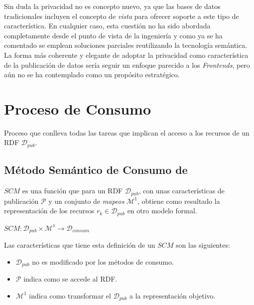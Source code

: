 Sin duda la privacidad no es concepto nuevo, ya que las bases de datos tradicionales incluyen el concepto
de \textit{vista} para ofrecer soporte a este tipo de característica. En cualquier caso, esta cuestión no ha sido abordada
completamente desde el punto de vista de la ingeniería y como ya se ha comentado se emplean soluciones parciales
reutilizando la tecnología semántica. La forma más coherente y elegante de adoptar la privacidad como característica
de la publicación de datos sería seguir un enfoque parecido a los \linkeddata \textit{Frontends}, pero aún no se ha contemplado como un propósito estratégico.

\section{Proceso de Consumo}

\begin{definition}[Consumo]
Proceso que conlleva todas las tareas que implican el acceso a los recursos de un \dataset \gls{RDF} $\mathcal{D}_{pub}$.
\end{definition}


\subsection{Método Semántico de Consumo de \linkeddata}\label{sect:proceso-consumo}
\begin{definition}
$SCM$ es una función que para un \dataset RDF $\mathcal{D}_{pub}$, con unas características de publicación $\mathcal{P}$ y un conjunto de \textit{mapeos}
$\mathcal{M}^1$, obtiene como resultado la representación de los recursos $r_k \in \mathcal{D}_{pub}$ en otro modelo formal.
\end{definition}

\begin{center}
    $SCM :  \mathcal{D}_{pub} \times \mathcal{M}^1 \longrightarrow \mathcal{D}_{consum}$
\end{center}
Las características que tiene esta definición de un $SCM$ son las siguientes:
\begin{itemize}
 \item $\mathcal{D}_{pub}$ no es modificado por los métodos de consumo.
 \item $\mathcal{P}$ indica como se accede al \dataset \gls{RDF}.
 \item $\mathcal{M}^1$ indica como transformar el \dataset $\mathcal{D}_{pub}$ a la representación objetivo.
 \end{itemize}

